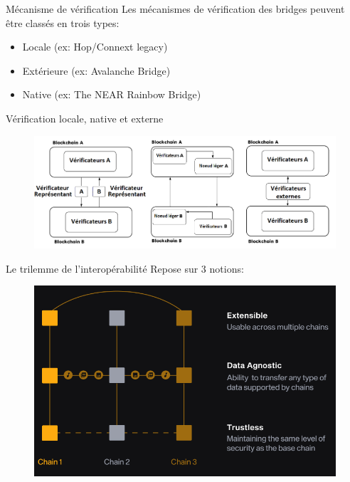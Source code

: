 \begin{frame}{Mécanisme de vérification}
Les mécanismes de vérification des bridges peuvent être classés en trois types:
\begin{itemize}
    \item Locale (ex: Hop/Connext legacy)
    \item Extérieure (ex: Avalanche Bridge)
    \item Native (ex: The NEAR Rainbow Bridge)
\end{itemize}
\end{frame}


\begin{frame}{Vérification locale, native et externe}
    \begin{figure}
        \centering
        \includegraphics[scale = 0.5]{img/DiagrammeResumeVerif.png}
    \end{figure}
\end{frame}

\begin{frame}{Le trilemme de l’interopérabilité}
    Repose sur 3 notions: 
    \begin{figure}
        \centering
        \includegraphics[scale = 0.7]{img/3notions.png}
    \end{figure}
    \end{frame}

